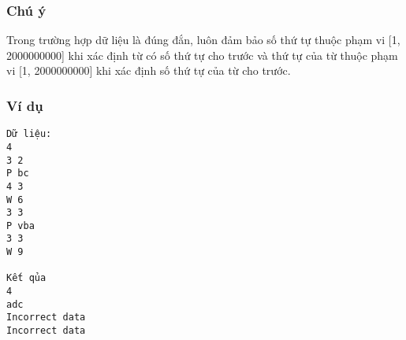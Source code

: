 \subsubsection{   Chú ý  }

   Trong trường hợp dữ liệu là đúng đắn, luôn đảm bảo số thứ tự thuộc phạm vi [1, 2000000000] khi xác định từ có số thứ tự cho trước và thứ tự của từ thuộc phạm vi [1, 2000000000] khi xác định số thứ tự của từ cho trước.  

\subsubsection{   Ví dụ  }
\begin{verbatim}
Dữ liệu:
4
3 2
P bc
4 3
W 6
3 3
P vba
3 3
W 9

Kết qủa
4
adc
Incorrect data
Incorrect data
\end{verbatim}